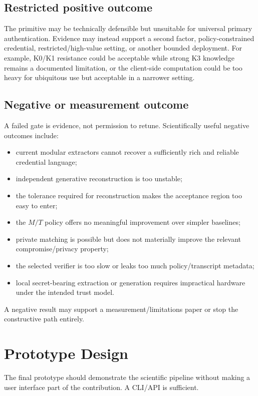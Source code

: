 \documentclass[11pt,a4paper]{article}
\begin{document}
\subsection{Restricted positive outcome}

The primitive may be technically defensible but unsuitable for universal primary authentication. Evidence may instead support a second factor, policy-constrained credential, restricted/high-value setting, or another bounded deployment. For example, K0/K1 resistance could be acceptable while strong K3 knowledge remains a documented limitation, or the client-side computation could be too heavy for ubiquitous use but acceptable in a narrower setting.

\subsection{Negative or measurement outcome}

A failed gate is evidence, not permission to retune. Scientifically useful negative outcomes include:
\begin{itemize}
  \item current modular extractors cannot recover a sufficiently rich and reliable credential language;
  \item independent generative reconstruction is too unstable;
  \item the tolerance required for reconstruction makes the acceptance region too easy to enter;
  \item the $M/T$ policy offers no meaningful improvement over simpler baselines;
  \item private matching is possible but does not materially improve the relevant compromise/privacy property;
  \item the selected verifier is too slow or leaks too much policy/transcript metadata;
  \item local secret-bearing extraction or generation requires impractical hardware under the intended trust model.
\end{itemize}

A negative result may support a measurement/limitations paper or stop the constructive path entirely.

\section{Prototype Design}

The final prototype should demonstrate the scientific pipeline without making a user interface part of the contribution. A CLI/API is sufficient.
\end{document}
